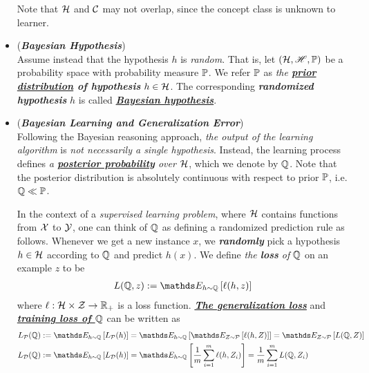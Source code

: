 \documentclass[11pt]{article}
\begin{document}
\begin{itemize}
\begin{definition}
Note that ${\mathcal H}$ and ${\mathcal C}$ may not overlap, since the concept class is unknown to learner. 
\end{definition}

\item  \begin{definition} (\emph{\textbf{Bayesian Hypothesis}})\\
Assume instead that the hypothesis $h$ is \emph{random}. That is, let $({\mathcal H}, {\mathscr H}, {\mathbb P})$ be a probability space with probability measure ${\mathbb P}$. We refer ${\mathbb P}$ as \emph{the \textbf{\underline{prior distribution} of hypothesis}} $h \in {\mathcal H}$. The corresponding \emph{\textbf{randomized hypothesis}} $h$ is called \underline{\emph{\textbf{Bayesian hypothesis}}}.
\end{definition}



\item \begin{definition}(\textbf{\emph{Bayesian Learning and Generalization Error}})\\
Following the Bayesian reasoning approach, \emph{the output of the learning algorithm} is \emph{not necessarily a single hypothesis}. Instead, the learning
process defines \emph{a \textbf{\underline{posterior probability}} over ${\mathcal H}$}, which we denote by ${\mathbb Q}$. Note that the posterior distribution is absolutely continuous with respect to prior ${\mathbb P}$, i.e. ${\mathbb Q} \ll {\mathbb P}$. 

In the context of a \emph{supervised learning problem}, where ${\mathcal H}$ contains functions from ${\mathcal X}$ to ${\mathcal Y}$, one can think of ${\mathbb Q}$ as defining a randomized prediction rule as follows.  Whenever we get a new instance $x$, we \emph{\textbf{randomly}} pick a hypothesis $h \in {\mathcal H}$ according to ${\mathbb Q}$ and predict $h(x)$. We define \emph{the \textbf{loss} of} ${\mathbb Q}$ on an example $z$ to be
\begin{align}
L(\bQ, z) := \E{h \sim \bQ}{\ell(h, z)} \label{def: bayesian_hypothesis_loss}
\end{align} where $\ell: {\mathcal H} \times {\mathcal Z} \to {\mathbb R}_{+}$ is a loss function. \underline{\emph{\textbf{The generalization loss}}} and \underline{\emph{\textbf{training loss of ${\mathbb Q}$}}} can be written as
\begin{align}
L_{\cP}(\bQ)& := \E{h \sim \bQ}{L_{\cP}(h)} =  \E{h \sim \bQ}{\E{Z \sim \cP}{\ell(h, Z)}}  = \E{Z \sim \cP}{L(\bQ, Z)}\label{def: bayesian_hypothesis_generalization_error}\\
L_{\cD}(\bQ)& :=\E{h \sim \bQ}{L_{\cD}(h)} =  \E{h \sim \bQ}{\frac{1}{m}\sum_{i=1}^{m}\ell(h, Z_i)} =  \frac{1}{m}\sum_{i=1}^{m}L(\bQ, Z_i) \label{def: bayesian_hypothesis_training_error}
\end{align}
\end{definition}


\end{itemize}
\end{document}
